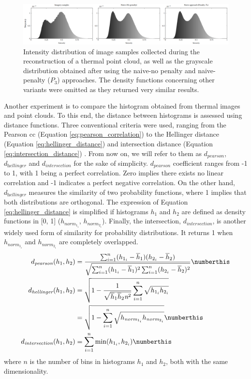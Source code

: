 \begin{figure}
    \centering
    \includegraphics[width=\linewidth]{figs/thermal_projection/density_function.png}
	\caption{Intensity distribution of image samples collected during the reconstruction of a thermal point cloud, as well as the grayscale distribution obtained after using the naive-no penalty and naive-penalty ($P_3$) approaches. The density functions concerning other variants were omitted as they returned very similar results.}
	\label{fig:thermal_histogram_results}
\end{figure}

Another experiment is to compare the histogram obtained from thermal images and point clouds. To this end, the distance between histograms is assessed using distance functions. Three conventional criteria were used, ranging from the Pearson \acrshort{cc} (Equation \ref{eq:pearson_correlation}) to the Hellinger distance (Equation \ref{eq:hellinger_distance}) and intersection distance (Equation \ref{eq:intersection_distance}) \cite{cha_comprehensive_2007}. From now on, we will refer to them as $d_{\textit{pearson}}$, $d_{\textit{hellinger}}$ and $d_{\textit{intersection}}$ for the sake of simplicity. $d_{\textit{pearson}}$ coefficient ranges from -1 to 1, with 1 being a perfect correlation. Zero implies there exists no linear correlation and -1 indicates a perfect negative correlation. On the other hand, $d_{\textit{hellinger}}$ measures the similarity of two probability functions, where 1 implies that both distributions are orthogonal. The expression of Equation \ref{eq:hellinger_distance} is simplified if histograms $h_1$ and $h_2$ are defined as density functions in [0, 1] ($h_{\textit{norm}_{1_{i}}}$, $h_{\textit{norm}_{2_{i}}}$). Finally, the intersection, $d_{\textit{intersection}}$, is another widely used form of similarity for probability distributions. It returns 1 when $h_{\textit{norm}_{1_{i}}}$ and $h_{\textit{norm}_{2_{i}}}$ are completely overlapped. 
\begin{align*}
    d_{\textit{pearson}}(h_1, h_2) &= \frac{\sum_{i=1}^{n} (h_{1_{i}} - \overline{h}_{1}) (h_{2_{i}} - \overline{h}_{2})}{\sqrt{\sum_{i=1}^{n} (h_{1_{i}} - \overline{h}_{1})^2 \sum_{i=1}^{n} (h_{2_{i}} - \overline{h}_{2})^2}}
    \numberthis \label{eq:pearson_correlation}\\
    d_{\textit{hellinger}}(h_1, h_2)
    &=\sqrt{1 - \frac{1}{\sqrt{\overline{h}_1 \overline{h}_2 \textit{n}^2}} \sum_{i=1}^{n} \sqrt{h_{1_{i}}h_{2_{i}}}}\\
    &=\sqrt{1 - \sum_{i=1}^{n} \sqrt{h_{\textit{norm}_{1_{i}}}h_{\textit{norm}_{2_{i}}}}}
    \numberthis \label{eq:hellinger_distance}\\
    d_{\textit{intersection}}(h_1, h_2)
    &=\sum_{i=1}^{n} \min(h_{1_{i}}, h_{2_{i}})
    \numberthis \label{eq:intersection_distance}
\end{align*}
where $n$ is the number of bins in histograms $h_1$ and $h_2$, both with the same dimensionality.

